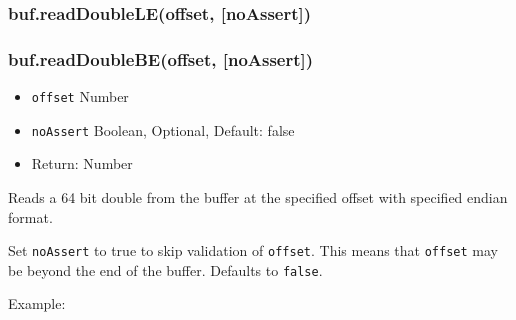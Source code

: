 \subsubsection{buf.readDoubleLE(offset,
{[}noAssert{]})}\label{buf.readdoubleleoffset-noassert}

\subsubsection{buf.readDoubleBE(offset,
{[}noAssert{]})}\label{buf.readdoublebeoffset-noassert}

\begin{itemize}
\itemsep1pt\parskip0pt
\item
  \texttt{offset} Number
\item
  \texttt{noAssert} Boolean, Optional, Default: false
\item
  Return: Number
\end{itemize}

Reads a 64 bit double from the buffer at the specified offset with
specified endian format.

Set \texttt{noAssert} to true to skip validation of \texttt{offset}.
This means that \texttt{offset} may be beyond the end of the buffer.
Defaults to \texttt{false}.

Example:

\begin{Shaded}
\begin{Highlighting}[]
  \NormalTok{(}\NormalTok{);}

\NormalTok{buf[}\NormalTok{] = }\NormalTok{;}
\NormalTok{buf[}\NormalTok{] = }\NormalTok{;}
\NormalTok{buf[}\NormalTok{] = }\NormalTok{;}
\NormalTok{buf[}\NormalTok{] = }\NormalTok{;}
\NormalTok{buf[}\NormalTok{] = }\NormalTok{;}
\NormalTok{buf[}\NormalTok{] = }\NormalTok{;}
\NormalTok{buf[}\NormalTok{] = }\NormalTok{;}
\NormalTok{buf[}\NormalTok{] = }\NormalTok{;}

\NormalTok{(}\NormalTok{(}\NormalTok{));}

\end{Highlighting}
\end{Shaded}

